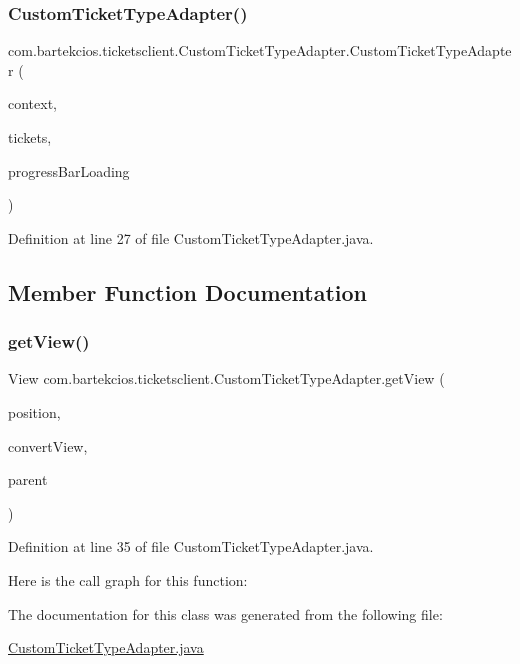 \subsubsection{\texorpdfstring{Custom\+Ticket\+Type\+Adapter()}{CustomTicketTypeAdapter()}}
{\footnotesize\ttfamily com.\+bartekcios.\+ticketsclient.\+Custom\+Ticket\+Type\+Adapter.\+Custom\+Ticket\+Type\+Adapter (\begin{DoxyParamCaption}\item[{Context}]{context,  }\item[{List$<$ \hyperlink{classcom_1_1bartekcios_1_1ticketsclient_1_1_ticket_type}{Ticket\+Type} $>$}]{tickets,  }\item[{Progress\+Bar}]{progress\+Bar\+Loading }\end{DoxyParamCaption})}



Definition at line 27 of file Custom\+Ticket\+Type\+Adapter.\+java.



\subsection{Member Function Documentation}
\mbox{\label{classcom_1_1bartekcios_1_1ticketsclient_1_1_custom_ticket_type_adapter_acf4fd29b15524f88e0a297603bbdc6f0}} 
\subsubsection{\texorpdfstring{get\+View()}{getView()}}
{\footnotesize\ttfamily View com.\+bartekcios.\+ticketsclient.\+Custom\+Ticket\+Type\+Adapter.\+get\+View (\begin{DoxyParamCaption}\item[{int}]{position,  }\item[{View}]{convert\+View,  }\item[{View\+Group}]{parent }\end{DoxyParamCaption})}



Definition at line 35 of file Custom\+Ticket\+Type\+Adapter.\+java.

Here is the call graph for this function\+:


The documentation for this class was generated from the following file\+:\begin{DoxyCompactItemize}
\item 
\hyperlink{_custom_ticket_type_adapter_8java}{Custom\+Ticket\+Type\+Adapter.\+java}\end{DoxyCompactItemize}
